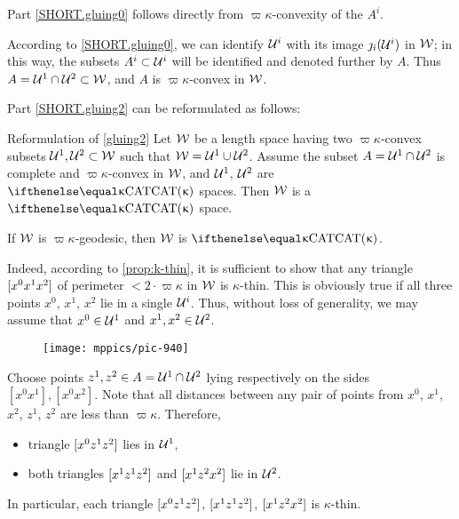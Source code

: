 Part \ref{SHORT.gluing0}
follows directly from $\varpi\kappa$-convexity of the $A^i$.

According to \ref{SHORT.gluing0},
we can identify $\mathcal{U}^i$ with its image $\jmath_i(\mathcal{U}^i)$ in $\mathcal{W}$;
in this way, the subsets $A^i\subset \spc{U}^i$ will be identified and denoted further by $A$.
Thus   $A=\spc{U}^1\cap \spc{U}^2\subset \spc{W}$,
and $A$ is $\varpi\kappa$-convex in $\mathcal{W}$.

Part \ref{SHORT.gluing2} can be reformulated as follows:

\begin{thm}{Reformulation of \ref{gluing2}}\label{thm:gluing2-reformulated}
Let $\mathcal{W}$ be a 
length space having two 
$\varpi\kappa$-convex subsets $\spc{U}^1,\spc{U}^2\subset\spc{W}$ such that
$\spc{W}=\spc{U}^1\cup\spc{U}^2$.
Assume the subset $A=\spc{U}^1\cap \spc{U}^2$ is complete and $\varpi\kappa$-convex in $\mathcal{W}$, and $\mathcal{U}^1$, $\mathcal{U}^2$ are $\CAT\kappa$ spaces.
Then $\mathcal{W}$ is a $\CAT\kappa$ space.
\end{thm}

\begin{clm}{}\label{clm:geod-gluing}
If $\mathcal{W}$ is $\varpi\kappa$-geodesic, then $\mathcal{W}$ is $\CAT\kappa$.
\end{clm}

Indeed, 
according to \ref{prop:k-thin},
it is sufficient to show that any triangle $[{x^0}{x^1}{x^2}]$ of perimeter $<2\cdot \varpi\kappa$ 
in $\mathcal{W}$ is $\kappa$-thin.
This is obviously true if all three points $x^0$, $x^1$, $x^2$ lie in a single $\mathcal{U}^i$.
Thus, without loss of generality, we may assume that $x^0\in\spc{U}^1$ and $x^1,x^2\in\spc{U}^2$.
\begin{figure}[!ht]
\vskip-0mm
\centering
\texttt{[image: mppics/pic-940]}
\end{figure}

Choose points $z^1,z^2\in A=\spc{U}^1\cap\spc{U}^2$ 
lying respectively on the sides $[x^0x^1], [x^0x^2]$.
Note that all distances between any pair of points from $x^0$, $x^1$, $x^2$, $z^1$, $z^2$ are less than $\varpi\kappa$.
Therefore,
\begin{itemize}
\item triangle $[{x^0}{z^1}{z^2}]$ lies in $\mathcal{U}^1$,
\item both triangles $[{x^1}{z^1}{z^2}]$ and $[{x^1}{z^2}{x^2}]$ lie in $\mathcal{U}^2$.
\end{itemize}
In particular, each triangle $[{x^0}{z^1}{z^2}]$,
$[{x^1}{z^1}{z^2}]$, $[{x^1}{z^2}{x^2}]$ is $\kappa$-thin.

